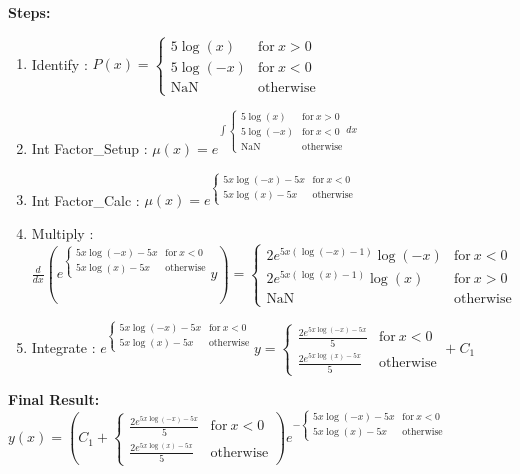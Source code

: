 \documentclass{article}
\begin{document}
\textbf{Steps:}
\begin{enumerate}
\item Identify :  $P(x) = \begin{cases} 5 \log{\left(x \right)} & \text{for}\: x > 0 \\5 \log{\left(- x \right)} & \text{for}\: x < 0 \\\text{NaN} & \text{otherwise} \end{cases}$
\item Int Factor_Setup :  $\mu(x) = e^{\int \begin{cases} 5 \log{\left(x \right)} & \text{for}\: x > 0 \\5 \log{\left(- x \right)} & \text{for}\: x < 0 \\\text{NaN} & \text{otherwise} \end{cases} dx}$
\item Int Factor_Calc :  $\mu(x) = e^{\begin{cases} 5 x \log{\left(- x \right)} - 5 x & \text{for}\: x < 0 \\5 x \log{\left(x \right)} - 5 x & \text{otherwise} \end{cases}}$
\item Multiply :  $\frac{d}{dx}(e^{\begin{cases} 5 x \log{\left(- x \right)} - 5 x & \text{for}\: x < 0 \\5 x \log{\left(x \right)} - 5 x & \text{otherwise} \end{cases}}y) = \begin{cases} 2 e^{5 x \left(\log{\left(- x \right)} - 1\right)} \log{\left(- x \right)} & \text{for}\: x < 0 \\2 e^{5 x \left(\log{\left(x \right)} - 1\right)} \log{\left(x \right)} & \text{for}\: x > 0 \\\text{NaN} & \text{otherwise} \end{cases}$
\item Integrate :  $e^{\begin{cases} 5 x \log{\left(- x \right)} - 5 x & \text{for}\: x < 0 \\5 x \log{\left(x \right)} - 5 x & \text{otherwise} \end{cases}}y = \begin{cases} \frac{2 e^{5 x \log{\left(- x \right)} - 5 x}}{5} & \text{for}\: x < 0 \\\frac{2 e^{5 x \log{\left(x \right)} - 5 x}}{5} & \text{otherwise} \end{cases} + C_1$
\end{enumerate}
\textbf{Final Result:} $y{\left(x \right)} = \left(C_{1} + \begin{cases} \frac{2 e^{5 x \log{\left(- x \right)} - 5 x}}{5} & \text{for}\: x < 0 \\\frac{2 e^{5 x \log{\left(x \right)} - 5 x}}{5} & \text{otherwise} \end{cases}\right) e^{- \begin{cases} 5 x \log{\left(- x \right)} - 5 x & \text{for}\: x < 0 \\5 x \log{\left(x \right)} - 5 x & \text{otherwise} \end{cases}}$
\end{document}
